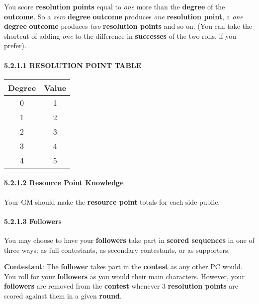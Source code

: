 \documentclass[
  11pt,
]{article}
\begin{document}
You score \textbf{resolution points} equal to \emph{one} more than the
\textbf{degree} of the \textbf{outcome}. So a \emph{zero}
\textbf{degree} \textbf{outcome} produces \emph{one} \textbf{resolution
point}, a \emph{one} \textbf{degree} \textbf{outcome} produces
\emph{two} \textbf{resolution points} and so on. (You can take the
shortcut of adding \emph{one} to the difference in \textbf{successes} of
the two rolls, if you prefer).

\hypertarget{resolution-point-table}{%
\paragraph{5.2.1.1 RESOLUTION POINT
TABLE}\label{resolution-point-table}}

\begin{longtable}[]{@{}cc@{}}
\toprule
Degree & Value \\
\midrule
\endhead
0 & 1 \\
1 & 2 \\
2 & 3 \\
3 & 4 \\
4 & 5 \\
\bottomrule
\end{longtable}

\hypertarget{resource-point-knowledge}{%
\paragraph{5.2.1.2 Resource Point
Knowledge}\label{resource-point-knowledge}}

Your GM should make the \textbf{resource point} totals for each side
public.

\hypertarget{followers}{%
\paragraph{5.2.1.3 Followers}\label{followers}}

You may choose to have your \textbf{followers} take part in
\textbf{scored sequences} in one of three ways: as full contestants, as
secondary contestants, or as supporters.

\textbf{Contestant}: The \textbf{follower} takes part in the
\textbf{contest} as any other PC would. You roll for your
\textbf{followers} as you would their main characters. However, your
\textbf{followers} are removed from the \textbf{contest} whenever 3
\textbf{resolution points} are scored against them in a given
\textbf{round}.
\end{document}
